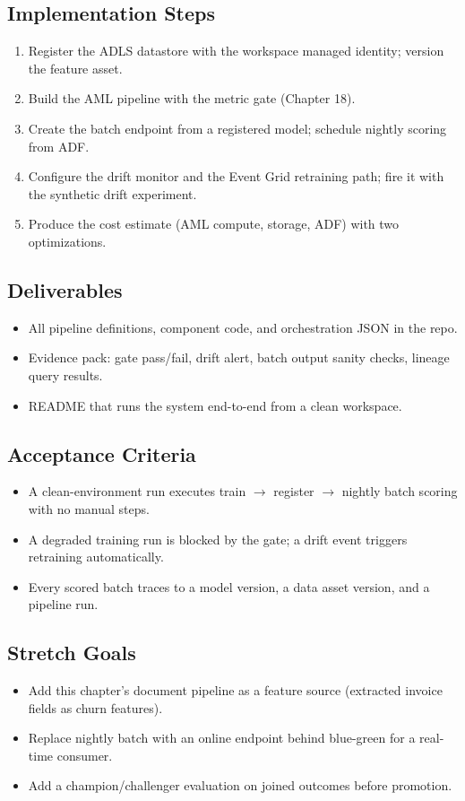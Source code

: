 \subsection*{Implementation Steps}
\begin{enumerate}
    \item Register the ADLS datastore with the workspace managed identity; version the feature asset.
    \item Build the AML pipeline with the metric gate (Chapter 18).
    \item Create the batch endpoint from a registered model; schedule nightly scoring from ADF.
    \item Configure the drift monitor and the Event Grid retraining path; fire it with the synthetic drift experiment.
    \item Produce the cost estimate (AML compute, storage, ADF) with two optimizations.
\end{enumerate}

\subsection*{Deliverables}
\begin{itemize}
    \item All pipeline definitions, component code, and orchestration JSON in the repo.
    \item Evidence pack: gate pass/fail, drift alert, batch output sanity checks, lineage query results.
    \item README that runs the system end-to-end from a clean workspace.
\end{itemize}

\subsection*{Acceptance Criteria}
\begin{itemize}
    \item A clean-environment run executes train $\rightarrow$ register $\rightarrow$ nightly batch scoring with no manual steps.
    \item A degraded training run is blocked by the gate; a drift event triggers retraining automatically.
    \item Every scored batch traces to a model version, a data asset version, and a pipeline run.
\end{itemize}

\subsection*{Stretch Goals}
\begin{itemize}
    \item Add this chapter's document pipeline as a feature source (extracted invoice fields as churn features).
    \item Replace nightly batch with an online endpoint behind blue-green for a real-time consumer.
    \item Add a champion/challenger evaluation on joined outcomes before promotion.
\end{itemize}
